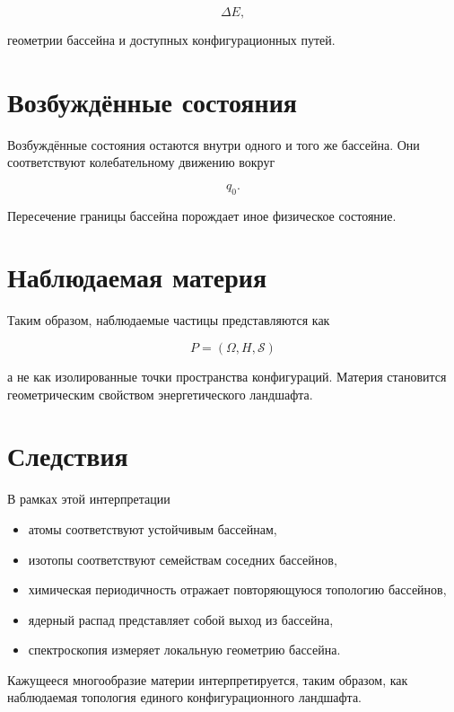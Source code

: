 \[ \Delta E, \]

геометрии бассейна и доступных конфигурационных путей.

\section{Возбуждённые состояния}

Возбуждённые состояния остаются внутри одного и того же бассейна. Они соответствуют колебательному движению вокруг

\[ q_0. \]

Пересечение границы бассейна порождает иное физическое состояние.

\section{Наблюдаемая материя}

Таким образом, наблюдаемые частицы представляются как

\[ \boxed{ P = (\Omega, H, \mathcal S) } \]

а не как изолированные точки пространства конфигураций. Материя становится геометрическим свойством энергетического ландшафта.

\section{Следствия}

В рамках этой интерпретации

\begin{itemize}

\item атомы соответствуют устойчивым бассейнам,

\item изотопы соответствуют семействам соседних бассейнов,

\item химическая периодичность отражает повторяющуюся топологию бассейнов,

\item ядерный распад представляет собой выход из бассейна,

\item спектроскопия измеряет локальную геометрию бассейна.

\end{itemize}

Кажущееся многообразие материи интерпретируется, таким образом, как наблюдаемая топология единого конфигурационного ландшафта.

